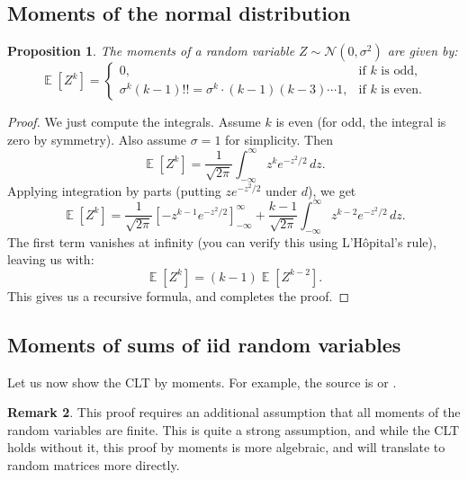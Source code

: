 \documentclass[letterpaper,11pt,oneside,reqno]{book}
\numberwithin{equation}{chapter}  %
\newtheorem{proposition}{Proposition}[chapter]  %
\theoremstyle{definition}
\newtheorem{remark}[proposition]{Remark}
\begin{document}
\subsection{Moments of the normal distribution}

\begin{proposition}
The moments of a random variable $Z \sim \mathcal{N}(0, \sigma^2)$ are given by:
\begin{equation}
	\label{lecture1:eq:normal-moments}
	\operatorname{\mathbb{E}}[Z^k] = \begin{cases}
		0, & \text{if } k \text{ is odd}, \\
		\sigma^k (k-1)!! = \sigma^k \cdot (k-1)(k-3) \cdots 1, & \text{if } k \text{ is even}.
	\end{cases}
\end{equation}
\end{proposition}
\begin{proof}
	We just compute the integrals. Assume $k$ is even (for odd,
	the integral is zero by symmetry). Also assume $\sigma = 1$ for simplicity.
	Then
\begin{equation*}
	\operatorname{\mathbb{E}}[Z^k]
	=
	\frac{1}{\sqrt{2\pi}}
	\int_{-\infty}^{\infty}  z^k e^{-z^2/2} \, dz.
\end{equation*}
Applying integration by parts (putting $ze^{-z^2/2}$ under $d$), we get
\begin{equation*}
	\operatorname{\mathbb{E}}[Z^k] = \frac{1}{\sqrt{2\pi}} \left[-z^{k-1}e^{-z^2/2}\right]_{-\infty}^{\infty} + \frac{k-1}{\sqrt{2\pi}} \int_{-\infty}^{\infty} z^{k-2} e^{-z^2/2} \, dz.
\end{equation*}
The first term vanishes at infinity (you can verify this using L'Hôpital's rule), leaving us with:
\begin{equation*}
	\operatorname{\mathbb{E}}[Z^k] = (k-1)\operatorname{\mathbb{E}}[Z^{k-2}].
\end{equation*}
This gives us a recursive formula, and completes the proof.
\end{proof}


\subsection{Moments of sums of iid random variables}

Let us now show the CLT by moments.
For example, the source is
\cite[Section~30]{billingsley1995probability}
or \cite{filmus2010two}.


\begin{remark}
	This proof requires an additional assumption
	that all moments of the random variables are finite.
	This is quite a strong assumption, and while the CLT holds
	without it, this proof by moments is more algebraic, and
	will translate to random matrices more directly.
\end{remark}
\end{document}
